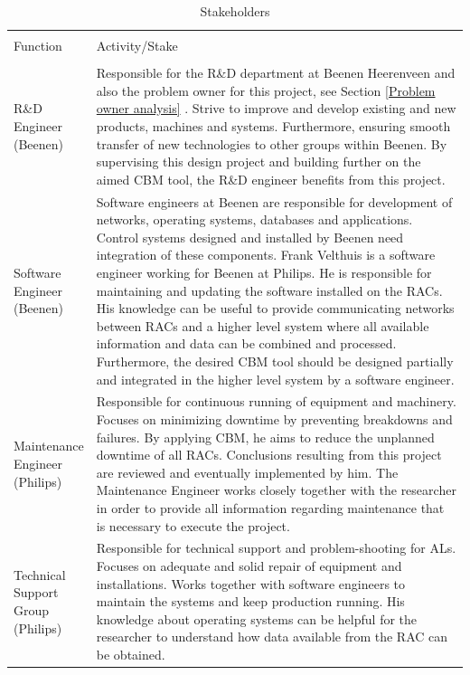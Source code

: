 \begin{center}
\begin{longtable}[width=\textwidth]{ p{} | p{}}
\caption[Stakeholders]{Stakeholders} \vspace{0.3cm} \label{tab:philips employees} \\
Function & Activity/Stake \\ [1ex]
\hline \\
\parbox[t]{0.15\textwidth}{R\&D\\Engineer\\(Beenen)} & Responsible for the R\&D department at Beenen Heerenveen and also the problem owner for this project, see Section \ref{Problem owner analysis} . Strive to improve and develop existing and new products, machines and systems. Furthermore, ensuring smooth transfer of new technologies to other groups within Beenen. By supervising this design project and building further on the aimed CBM tool, the R\&D engineer benefits from this project. \\ [2ex]
\parbox[t]{0.15\textwidth}{Software\\Engineer\\(Beenen)} & Software engineers at Beenen are responsible for development of networks, operating systems, databases and applications. Control systems designed and installed by Beenen need integration of these components. Frank Velthuis is a software engineer working for Beenen at Philips. He is responsible for maintaining and updating the software installed on the RACs. His knowledge can be useful to provide communicating networks between RACs and a higher level system where all available information and data can be combined and processed. Furthermore, the desired CBM tool should be designed partially and integrated in the higher level system by a software engineer. \\ [2ex]
\parbox[t]{0.15\textwidth}{Maintenance\\Engineer\\(Philips)} & Responsible for continuous running of equipment and machinery. Focuses on minimizing downtime by preventing breakdowns and failures. By applying CBM, he aims to reduce the unplanned downtime of all RACs. Conclusions resulting from this project are reviewed and eventually implemented by him. The Maintenance Engineer works closely together with the researcher in order to provide all information regarding maintenance that is necessary to execute the project.  \\ [2ex]
\parbox[t]{0.15\textwidth}{Technical\\Support\\Group\\(Philips)} & Responsible for technical support and problem-shooting for ALs. Focuses on adequate and solid repair of equipment and installations. Works together with software engineers to maintain the systems and keep production running. His knowledge about operating systems can be helpful for the researcher to understand how data available from the RAC can be obtained.\\ [2ex]

\end{longtable}
\end{center}

